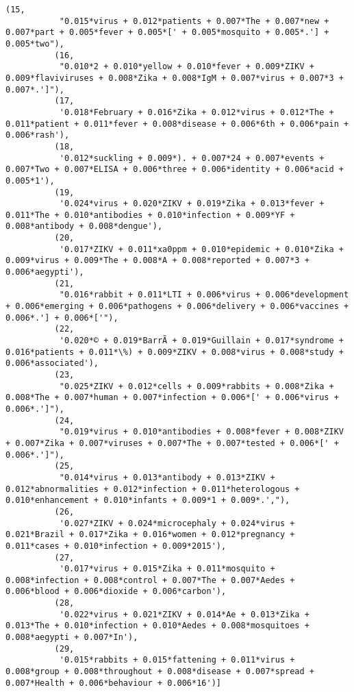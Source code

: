\documentclass[11pt]{article}
\begin{document}
\begin{Verbatim}[commandchars=\\\{\}]
          (15,
           "0.015*virus + 0.012*patients + 0.007*The + 0.007*new + 0.007*part + 0.005*fever + 0.005*[' + 0.005*mosquito + 0.005*.'] + 0.005*two"),
          (16,
           "0.010*2 + 0.010*yellow + 0.010*fever + 0.009*ZIKV + 0.009*flaviviruses + 0.008*Zika + 0.008*IgM + 0.007*virus + 0.007*3 + 0.007*.']"),
          (17,
           '0.018*February + 0.016*Zika + 0.012*virus + 0.012*The + 0.011*patient + 0.011*fever + 0.008*disease + 0.006*6th + 0.006*pain + 0.006*rash'),
          (18,
           '0.012*suckling + 0.009*). + 0.007*24 + 0.007*events + 0.007*Two + 0.007*ELISA + 0.006*three + 0.006*identity + 0.006*acid + 0.005*1'),
          (19,
           '0.024*virus + 0.020*ZIKV + 0.019*Zika + 0.013*fever + 0.011*The + 0.010*antibodies + 0.010*infection + 0.009*YF + 0.008*antibody + 0.008*dengue'),
          (20,
           '0.017*ZIKV + 0.011*xa0ppm + 0.010*epidemic + 0.010*Zika + 0.009*virus + 0.009*The + 0.008*A + 0.008*reported + 0.007*3 + 0.006*aegypti'),
          (21,
           "0.016*rabbit + 0.011*LTI + 0.006*virus + 0.006*development + 0.006*emerging + 0.006*pathogens + 0.006*delivery + 0.006*vaccines + 0.006*.'] + 0.006*['"),
          (22,
           '0.020*© + 0.019*BarrÃ + 0.019*Guillain + 0.017*syndrome + 0.016*patients + 0.011*\%) + 0.009*ZIKV + 0.008*virus + 0.008*study + 0.006*associated'),
          (23,
           "0.025*ZIKV + 0.012*cells + 0.009*rabbits + 0.008*Zika + 0.008*The + 0.007*human + 0.007*infection + 0.006*[' + 0.006*virus + 0.006*.']"),
          (24,
           "0.019*virus + 0.010*antibodies + 0.008*fever + 0.008*ZIKV + 0.007*Zika + 0.007*viruses + 0.007*The + 0.007*tested + 0.006*[' + 0.006*.']"),
          (25,
           "0.014*virus + 0.013*antibody + 0.013*ZIKV + 0.012*abnormalities + 0.012*infection + 0.011*heterologous + 0.010*enhancement + 0.010*infants + 0.009*1 + 0.009*.',"),
          (26,
           '0.027*ZIKV + 0.024*microcephaly + 0.024*virus + 0.021*Brazil + 0.017*Zika + 0.016*women + 0.012*pregnancy + 0.011*cases + 0.010*infection + 0.009*2015'),
          (27,
           '0.017*virus + 0.015*Zika + 0.011*mosquito + 0.008*infection + 0.008*control + 0.007*The + 0.007*Aedes + 0.006*blood + 0.006*dioxide + 0.006*carbon'),
          (28,
           '0.022*virus + 0.021*ZIKV + 0.014*Ae + 0.013*Zika + 0.013*The + 0.010*infection + 0.010*Aedes + 0.008*mosquitoes + 0.008*aegypti + 0.007*In'),
          (29,
           '0.015*rabbits + 0.015*fattening + 0.011*virus + 0.008*group + 0.008*throughout + 0.008*disease + 0.007*spread + 0.007*Health + 0.006*behaviour + 0.006*16')]
\end{Verbatim}
        
\end{document}
